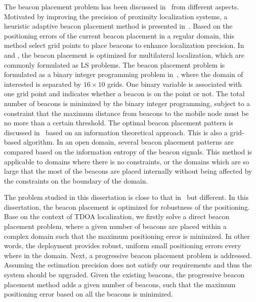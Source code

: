 The beacon placement problem has been discussed in~\cite{bulusu01adaptive,WangEstrinInfomationSS05,YickOptBeaconPlacement04} from different aspects. Motivated by improving the precision of proximity localization systems, a heuristic adaptive beacon placement method is presented in~\cite{bulusu01adaptive}. Based on the positioning errors of the current beacon placement in a regular domain, this method select grid points to place beacons to enhance localization precision.
    In~\cite{YickOptBeaconPlacement04} and \cite{WangEstrinInfomationSS05}, the beacon placement is optimized for multilateral localization, which are commonly formulated as LS problems. The beacon placement problem is formulated as a binary integer programming problem in~\cite{YickOptBeaconPlacement04}, where the domain of interested is separated by $16\times 10$ grids. One binary variable is associated with one grid point and indicates whether a beacon is on the point or not. The total number of beacons is minimized by the binary integer programming, subject to a constraint that the maximum distance from beacons to the mobile node must be no more than a certain threshold.
        The optimal beacon placement pattern is discussed in~\cite{WangEstrinInfomationSS05}
         based on an information theoretical approach. This is also a grid-based algorithm. In an open domain, several beacon placement patterns are compared based on the information entropy of the beacon signals. This method is applicable to domains where there is no constraints, or the domains which are so large that the most of the beacons are placed internally without being affected by the constraints on the boundary of the domain.


The problem studied in this dissertation is close to that in~\cite{YickOptBeaconPlacement04} but different. In this dissertation, the beacon placement is optimized for robustness of the positioning. Base on the context of TDOA localization, we firstly solve a direct beacon placement problem, where a given number of beacons are placed within a complex domain such that the maximum positioning error is minimized. In other words, the deployment provides robust, uniform small positioning errors every where in the domain.
    Next, a progressive beacon placement problem is addressed. Assuming the estimation precision does not satisfy our requirements and thus the system should be upgraded. Given the existing beacons, the progressive beacon placement method adds a given number of beacons, such that the maximum positioning error based on all the beacons is minimized.

